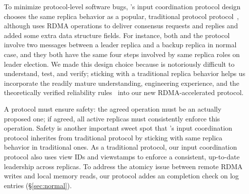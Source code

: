 To minimize protocol-level software bugs, \xxx's input coordination protocol 
design chooses the same replica behavior as a popular, traditional 
\paxos protocol protocol~\cite{paxos:practical}, although \xxx uses RDMA 
operations to deliver consensus requests and replies and added some extra data 
structure fields. For instance, both \xxx and the 
protocol~\cite{paxos:practical} involve two messages between a leader replica 
and a backup replica in normal case, and they both have the same four steps 
involved by same replica roles on leader election. We made this design choice 
because \paxos is notoriously difficult to understand, test, and verify; 
sticking with a traditional replica behavior helps us incorporate the readily 
mature understanding, engineering experience, and the theoretically verified 
reliability rules~\cite{nsdi07} into our new RDMA-accelerated \paxos protocol.

A \paxos protocol must ensure safety: the agreed operation must be an actually 
proposed one; if agreed, all active replicas must consistently enforce this 
operation. Safety is another important sweet spot that \xxx's input 
coordination protocol inherites from traditional \paxos protocol by sticking 
with same replica behavior in traditional ones. As a traditional protocol, 
our input coordination protocol also uses view IDs and viewstamps to enforce a 
consistent, up-to-date leadership across replicas. To address the atomicy issue 
between remote RDMA writes and local memory reads, our protocol addes an 
completion check on log entries (\S\ref{sec:normal}).



